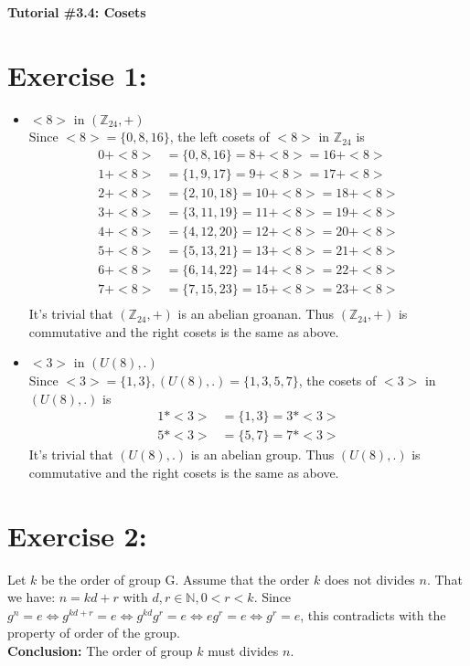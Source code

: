 \documentclass{article}
\newcommand{\Z}{\mathbb{Z}}
\newcommand{\N}{\mathbb{N}}
\begin{document}
	\centering
	\LARGE\textbf{Tutorial \#3.4: Cosets}\\
	
	\justify\Large
	
	\section{Exercise 1:}
		\begin{itemize}
			\item $<8>$ in $(\Z_{24}, +)$\\
			Since $<8> = \{0, 8, 16\}$, the left cosets of $<8>$ in $\Z_{24}$ is
			\begin{align*}
				0 + <8> &= \{0, 8, 16\} = 8 + <8> = 16 + <8>\\
				1 + <8> &= \{1, 9, 17\} = 9 + <8> = 17 + <8>\\
				2 + <8> &= \{2, 10, 18\} = 10 + <8> = 18 + <8>\\
				3 + <8> &= \{3, 11, 19\} = 11 + <8> = 19 + <8>\\
				4 + <8> &= \{4, 12, 20\} = 12 + <8> = 20 + <8>\\
				5 + <8> &= \{5, 13, 21\} = 13 + <8> = 21 + <8>\\
				6 + <8> &= \{6, 14, 22\} = 14 + <8> = 22 + <8>\\
				7 + <8> &= \{7, 15, 23\} = 15 + <8> = 23 + <8>\\
			\end{align*}
			It's trivial that $(\Z_{24}, +)$ is an abelian groanan. Thus $(\Z_{24}, +)$ is commutative and the right cosets is the same as above.
		\end{itemize}
		\begin{itemize}
			\item $<3>$ in $(U(8), .)$\\
			Since $<3> =\{1,3\}, (U(8), .) = \{1,3,5,7\}$, the cosets of $<3>$ in $(U(8), .)$ is
			\begin{align*}
				1 * <3> &= \{1, 3\} = 3 * <3>\\
				5 * <3> &= \{5, 7\} = 7 * <3>
			\end{align*}
			It's trivial that $(U(8), .)$ is an abelian group. Thus $(U(8), .)$ is commutative and the right cosets is the same as above.
		\end{itemize}
	
	\newpage
	\section{Exercise 2:}
		Let $k$ be the order of group G. Assume that the order $k$ does not divides $n$. That we have: $n = kd + r$ with $d, r\in \N, 0 < r < k$.
		Since $g^n = e \iff g^{kd+r} = e \iff g^{kd}g^r = e \iff eg^r = e \iff g^r =e$, this contradicts with the property of order of the group.\\
		\textbf{Conclusion:} The order of group $k$ must divides $n$.
	
\end{document}
